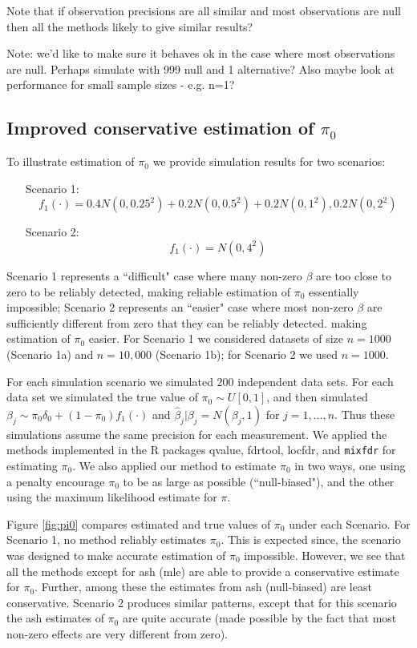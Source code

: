 \documentclass[11pt]{article}
\def\bhat{\hat{\beta}}
\def\mixfdr{{\tt mixfdr}\xspace}
\begin{document}
Note that if observation precisions are all similar and most observations are null then all the methods likely to give similar results?



Note: we'd like to make sure it behaves ok in the case where most observations are null.
Perhaps simulate with 999 null and 1 alternative?
Also maybe look at performance for small sample sizes - e.g. n=1?


\subsection*{Improved conservative estimation of $\pi_0$}

To illustrate estimation of $\pi_0$ we provide simulation results for two scenarios:
\begin{enumerate}
\item[Scenario 1:]
\begin{equation}
f_1(\cdot) =  0.4 N(0,0.25^2) + 0.2 N(0,0.5^2) + 0.2 N(0,1^2), 0.2 N(0,2^2)
\end{equation}
\item[Scenario 2:]
\begin{equation}
f_1(\cdot) = N(0,4^2)
\end{equation}
\end{enumerate}
Scenario 1 represents a ``difficult" case where many non-zero $\beta$ are
too close to  zero to be reliably detected, making reliable estimation of $\pi_0$ essentially impossible; 
Scenario 2 represents an ``easier" case where most non-zero $\beta$ are
sufficiently different from zero that they can be reliably detected. making estimation of $\pi_0$ easier.
For Scenario 1 we considered datasets of size $n=1000$ (Scenario 1a) and $n=10,000$ (Scenario 1b);
for Scenario 2 we used $n=1000$.

For each simulation scenario we simulated 200 independent data sets. For each data set we simulated
the true value of $\pi_0  \sim U[0,1]$, and then simulated $\beta_j \sim \pi_0 \delta_0 + (1-\pi_0) f_1(\cdot)$
and $\bhat_j | \beta_j = N(\beta_j,1)$ for $j=1,\dots,n$. Thus these simulations assume the same
precision for each measurement. We applied the methods implemented in the R packages qvalue, fdrtool, locfdr, and \mixfdr
for estimating $\pi_0$. We also applied our method to estimate $\pi_0$ in two ways, one using a penalty encourage
$\pi_0$ to be as large as possible (``null-biased"), and the other using the maximum likelihood estimate for $\pi$.


Figure \ref{fig:pi0} compares estimated and true values of $\pi_0$ under each Scenario. 
For Scenario 1, no method reliably estimates $\pi_0$. This is expected since, the scenario was designed to make accurate estimation
of $\pi_0$ impossible. However, we see that all the methods except for ash (mle) are able to provide a conservative
estimate for $\pi_0$. Further, among these the estimates from ash (null-biased) are least conservative. Scenario 2 produces similar patterns,
except that for this scenario the ash estimates of $\pi_0$ are quite accurate (made possible by the fact that most non-zero effects
are very different from zero).
\end{document}
